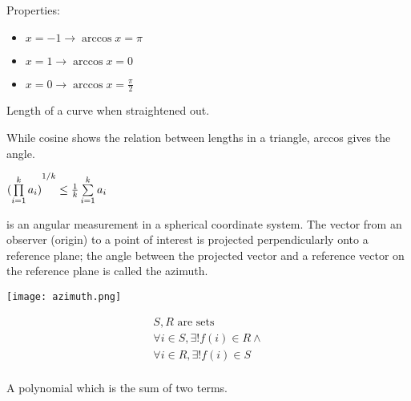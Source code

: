 \begin{definition}[arccos]\label{arccos}
    Properties:
    \begin{itemize}
        \item $ x = -1 \rightarrow \arccos{x} = \pi$
        \item $ x = 1 \rightarrow \arccos{x} = 0$
        \item $ x = 0 \rightarrow \arccos{x} = \frac{\pi}{2}$
    \end{itemize}
\end{definition}

\begin{definition}
    Length of a curve when straightened out.
\end{definition}
\begin{definition}[arccos]
    While cosine shows the relation between lengths in a triangle, 
    arccos gives the angle.
\end{definition}

\begin{definition}\label{arigeo}
    $
    \newline {(\prod\limits_{i = 1}^{k} a_{i})}^{1/k}
    \leq {1 \over k} \sum\limits_{i = 1}^{k} a_{i}
    $
\end{definition}

\begin{definition}[Azimuth]
     is an angular measurement in a spherical coordinate system. The vector
     from an observer (origin) to a point of interest is projected
     perpendicularly onto a reference plane; the angle between the projected
     vector and a reference vector on the reference plane is called the
     azimuth.

     \texttt{[image: azimuth.png]}

\end{definition}

\begin{definition}[Bijection]
    \begin{align}
        S,R \text{\ are sets} \\
        \forall{i \in S}, \exists!{f(i) \in R} \wedge \\
        \forall{i \in R}, \exists!{f(i) \in S} \\
    \end{align}
\end{definition}

\begin{definition}[Binomial]\label{binomial}
    A polynomial which is the sum of two terms.
\end{definition}

